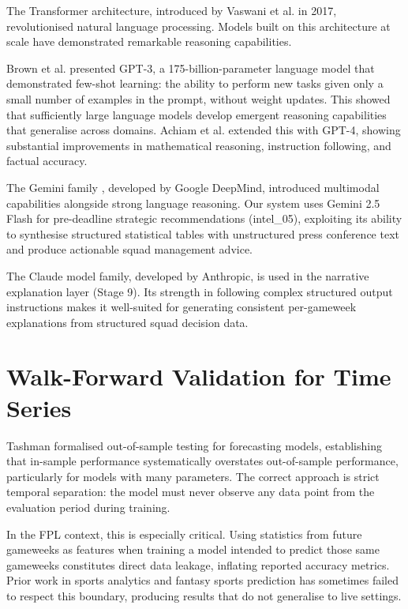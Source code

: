 The Transformer architecture, introduced by Vaswani et al. in 2017, revolutionised natural language processing. Models built on this architecture at scale have demonstrated remarkable reasoning capabilities.

Brown et al. \cite{brown2020gpt3} presented GPT-3, a 175-billion-parameter language model that demonstrated few-shot learning: the ability to perform new tasks given only a small number of examples in the prompt, without weight updates. This showed that sufficiently large language models develop emergent reasoning capabilities that generalise across domains. Achiam et al. \cite{achiam2023gpt4} extended this with GPT-4, showing substantial improvements in mathematical reasoning, instruction following, and factual accuracy.

The Gemini family \cite{geminiteam2024gemini}, developed by Google DeepMind, introduced multimodal capabilities alongside strong language reasoning. Our system uses Gemini 2.5 Flash for pre-deadline strategic recommendations (intel\_05), exploiting its ability to synthesise structured statistical tables with unstructured press conference text and produce actionable squad management advice.

The Claude model family, developed by Anthropic, is used in the narrative explanation layer (Stage 9). Its strength in following complex structured output instructions makes it well-suited for generating consistent per-gameweek explanations from structured squad decision data.

\section{Walk-Forward Validation for Time Series}

Tashman \cite{tashman2000out} formalised out-of-sample testing for forecasting models, establishing that in-sample performance systematically overstates out-of-sample performance, particularly for models with many parameters. The correct approach is strict temporal separation: the model must never observe any data point from the evaluation period during training.

In the FPL context, this is especially critical. Using statistics from future gameweeks as features when training a model intended to predict those same gameweeks constitutes direct data leakage, inflating reported accuracy metrics. Prior work in sports analytics and fantasy sports prediction has sometimes failed to respect this boundary, producing results that do not generalise to live settings.


